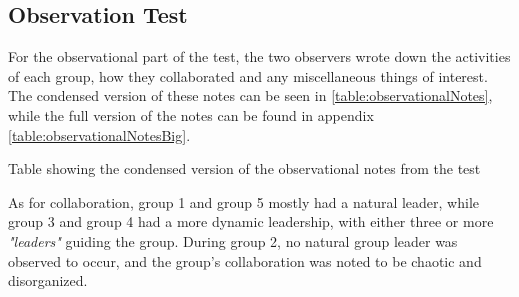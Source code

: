 \subsection{Observation Test}
For the observational part of the test, the two observers wrote down the activities of each group, how they collaborated and any miscellaneous things of interest. The condensed version of these notes can be seen in \autoref{table:observationalNotes}, while the full version of the notes can be found in appendix \autoref{table:observationalNotesBig}. 
\begin{table}[H]
\centering
\caption{Table showing the condensed version of the observational notes from the test}
\label{table:observationalNotes}

\end{table}
As for collaboration, group 1 and group 5 mostly had a natural leader, while group 3 and group 4 had a more dynamic leadership, with either three or more \textit{"leaders"} guiding the group. During group 2, no natural group leader was observed to occur, and the group's collaboration was noted to be chaotic and disorganized.